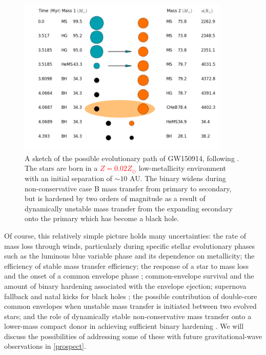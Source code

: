 \documentclass[iop,onecolumn]{revtex4}
\newcommand{\todo}[1]{\textcolor{red}{#1}}
\begin{document}
\begin{figure}
	\centering
	\includegraphics[width=0.9\textwidth]{COMPAS.png}
	\caption{\label{fig:COMPAS} A sketch of the possible evolutionary path of GW150914, following \citet{Stevenson:2017}.  The stars are born in a \todo{$Z=0.02 Z_\odot$} low-metallicity environment with an initial separation of $\sim 10$ AU.  The binary widens during non-conservative case B mass transfer from primary to secondary, but is hardened by two orders of magnitude as a result of dynamically unstable mass transfer from the expanding secondary onto the primary which has become a black hole.}
\end{figure}

Of course, this relatively simple picture holds many uncertainties: the rate of mass loss through winds, particularly during specific stellar evolutionary phases such as the luminous blue variable phase \citep{Mennekens:2014} and its dependence on metallicity; the efficiency of stable mass transfer efficiency; the response of a star to mass loss and the onset of a common envelope phase \citep{Pavlovskii:2017}; common-envelope survival and the amount of binary hardening associated with the envelope ejection; supernova fallback and natal kicks for black holes \citep[e.g.,][]{Repetto:2012,Mandel:2015kicks}; the possible contribution of double-core common envelopes when unstable mass transfer is initiated between two evolved stars; and the role of dynamically stable non-conservative mass transfer onto a lower-mass compact donor in achieving sufficient binary hardening  \citep{vandenHeuvel:2017,Neijssel:2018}.  We will discuss the possibilities of addressing some of these with future gravitational-wave observations in \autoref{prospect}.
\end{document}
